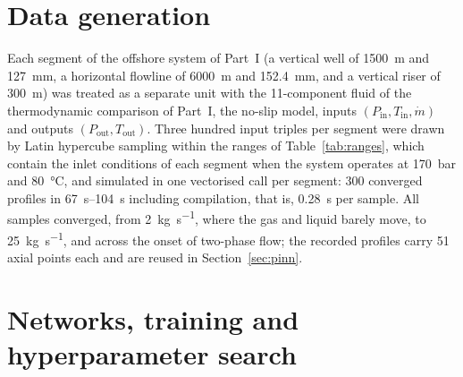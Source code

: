 \documentclass[a4paper,fleqn]{cas-sc}
\newcommand{\mdot}{\dot{m}}
\begin{document}
\section{Data generation}\label{sec:data}

Each segment of the offshore system of Part~I (a vertical well of \SI{1500}{\metre} and \SI{127}{\milli\metre}, a horizontal flowline of \SI{6000}{\metre} and \SI{152.4}{\milli\metre}, and a vertical riser of \SI{300}{\metre}) was treated as a separate unit with the 11-component fluid of the thermodynamic comparison of Part~I, the no-slip model, inputs $(P_\mathrm{in}, T_\mathrm{in}, \mdot)$ and outputs $(P_\mathrm{out}, T_\mathrm{out})$. Three hundred input triples per segment were drawn by Latin hypercube sampling \citep{mckay1979} within the ranges of Table~\ref{tab:ranges}, which contain the inlet conditions of each segment when the system operates at \SI{170}{\bar} and \SI{80}{\celsius}, and simulated in one vectorised call per segment: 300 converged profiles in \SIrange{67}{104}{\second} including compilation, that is, \SI{0.28}{\second} per sample. All samples converged, from \SI{2}{\kilogram\per\second}, where the gas and liquid barely move, to \SI{25}{\kilogram\per\second}, and across the onset of two-phase flow; the recorded profiles carry 51 axial points each and are reused in Section~\ref{sec:pinn}.

\begin{table}[htbp]
\caption{Sampling ranges of the inputs for the three segments.}\label{tab:ranges}
\footnotesize


\end{table}

\section{Networks, training and hyperparameter search}\label{sec:training}
\end{document}
